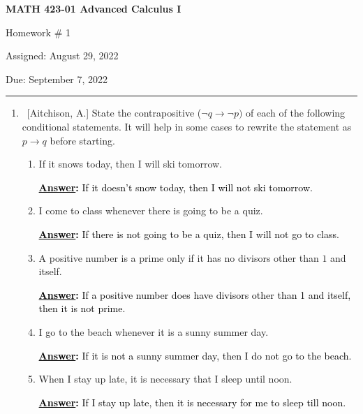 \documentclass[10pt]{article}
\begin{document}
\pagestyle{empty}  %

\begin{center}  %

{\bf MATH 423-01  Advanced Calculus I

Homework \# 1

Assigned: August 29, 2022

Due: September 7, 2022}

\end{center}

\medskip

\hrule   %

\bigskip


\begin{enumerate}


\item  ~[Aitchison, A.] State the contrapositive ($\neg q \to \neg p)$ of each of the following conditional statements.  It will help in some cases to rewrite the statement as $p \to q$ before starting.

	\begin{enumerate}
	
	\item  If it snows today, then I will ski tomorrow.
  \par \medskip
 \textbf{\textcolor{black}{\underline{Answer}:}}
{\textcolor{black}{If it doesn't snow today, then I will not ski tomorrow.}}
	
	\item  I come to class whenever there is going to be a quiz.
  \par \medskip
  \textbf{\textcolor{black}{\underline{Answer}:}}
{\textcolor{black}{If there is not going to be a quiz, then I will not go to class.}}
	
	\item  A positive number is a prime only if it has no divisors other than $1$ and itself.
	  \par \medskip
  \textbf{\textcolor{black}{\underline{Answer}:}}
{\textcolor{black}{If a positive number does have divisors other than 1 and itself, then it is not prime.}}
	\item  I go to the beach whenever it is a sunny summer day.
	   \par \medskip
  \textbf{\textcolor{black}{\underline{Answer}:}}
{\textcolor{black}{If it is not a sunny summer day, then I do not go to the beach.}}
	\item  When I stay up late, it is necessary that I sleep until noon.
		   \par \medskip
  \textbf{\textcolor{black}{\underline{Answer}:}}
{\textcolor{black}{If I stay up late, then it is necessary for me to sleep till noon.}}
	

\end{enumerate}
\end{enumerate}
\end{document}

